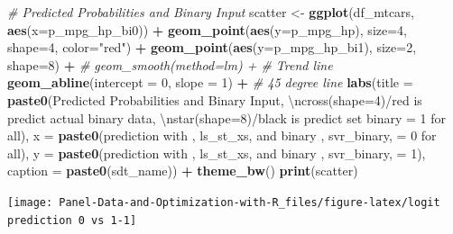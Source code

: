 \documentclass[
]{book}
\newenvironment{Shaded}{\begin{snugshade}}{\end{snugshade}}
\newcommand{\CharTok}[1]{\textcolor[rgb]{0.31,0.60,0.02}{#1}}
\newcommand{\CommentTok}[1]{\textcolor[rgb]{0.56,0.35,0.01}{\textit{#1}}}
\newcommand{\DataTypeTok}[1]{\textcolor[rgb]{0.13,0.29,0.53}{#1}}
\newcommand{\DecValTok}[1]{\textcolor[rgb]{0.00,0.00,0.81}{#1}}
\newcommand{\KeywordTok}[1]{\textcolor[rgb]{0.13,0.29,0.53}{\textbf{#1}}}
\newcommand{\NormalTok}[1]{#1}
\newcommand{\OperatorTok}[1]{\textcolor[rgb]{0.81,0.36,0.00}{\textbf{#1}}}
\newcommand{\StringTok}[1]{\textcolor[rgb]{0.31,0.60,0.02}{#1}}
\begin{document}
\begin{Shaded}
\begin{Highlighting}[]
\CommentTok{\# Predicted Probabilities and Binary Input}
\NormalTok{scatter \textless{}{-}}\StringTok{ }\KeywordTok{ggplot}\NormalTok{(df\_mtcars, }\KeywordTok{aes}\NormalTok{(}\DataTypeTok{x=}\NormalTok{p\_mpg\_hp\_bi0)) }\OperatorTok{+}
\StringTok{      }\KeywordTok{geom\_point}\NormalTok{(}\KeywordTok{aes}\NormalTok{(}\DataTypeTok{y=}\NormalTok{p\_mpg\_hp), }\DataTypeTok{size=}\DecValTok{4}\NormalTok{, }\DataTypeTok{shape=}\DecValTok{4}\NormalTok{, }\DataTypeTok{color=}\StringTok{"red"}\NormalTok{) }\OperatorTok{+}
\StringTok{      }\KeywordTok{geom\_point}\NormalTok{(}\KeywordTok{aes}\NormalTok{(}\DataTypeTok{y=}\NormalTok{p\_mpg\_hp\_bi1), }\DataTypeTok{size=}\DecValTok{2}\NormalTok{, }\DataTypeTok{shape=}\DecValTok{8}\NormalTok{) }\OperatorTok{+}
\StringTok{      }\CommentTok{\# geom\_smooth(method=lm) + \# Trend line}
\StringTok{      }\KeywordTok{geom\_abline}\NormalTok{(}\DataTypeTok{intercept =} \DecValTok{0}\NormalTok{, }\DataTypeTok{slope =} \DecValTok{1}\NormalTok{) }\OperatorTok{+}\StringTok{ }\CommentTok{\# 45 degree line}
\StringTok{      }\KeywordTok{labs}\NormalTok{(}\DataTypeTok{title =} \KeywordTok{paste0}\NormalTok{(}\StringTok{\textquotesingle{}Predicted Probabilities and Binary Input\textquotesingle{}}\NormalTok{,}
                          \StringTok{\textquotesingle{}}\CharTok{\textbackslash{}n}\StringTok{cross(shape=4)/red is predict actual binary data\textquotesingle{}}\NormalTok{,}
                          \StringTok{\textquotesingle{}}\CharTok{\textbackslash{}n}\StringTok{star(shape=8)/black is predict set binary = 1 for all\textquotesingle{}}\NormalTok{),}
            \DataTypeTok{x =} \KeywordTok{paste0}\NormalTok{(}\StringTok{\textquotesingle{}prediction with \textquotesingle{}}\NormalTok{, ls\_st\_xs, }\StringTok{\textquotesingle{} and binary \textquotesingle{}}\NormalTok{, svr\_binary, }\StringTok{\textquotesingle{} = 0 for all\textquotesingle{}}\NormalTok{),}
            \DataTypeTok{y =} \KeywordTok{paste0}\NormalTok{(}\StringTok{\textquotesingle{}prediction with \textquotesingle{}}\NormalTok{, ls\_st\_xs, }\StringTok{\textquotesingle{} and binary \textquotesingle{}}\NormalTok{, svr\_binary, }\StringTok{\textquotesingle{} = 1\textquotesingle{}}\NormalTok{),}
           \DataTypeTok{caption =} \KeywordTok{paste0}\NormalTok{(sdt\_name)) }\OperatorTok{+}
\StringTok{      }\KeywordTok{theme\_bw}\NormalTok{()}
\KeywordTok{print}\NormalTok{(scatter)}
\end{Highlighting}
\end{Shaded}

\begin{center}\texttt{[image: Panel-Data-and-Optimization-with-R\_files/figure-latex/logit prediction 0 vs 1-1]} \end{center}
\end{document}
